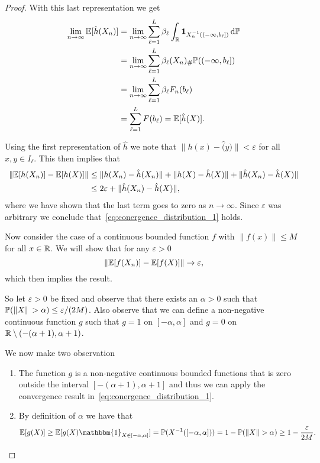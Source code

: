 \begin{proof}
With this last representation we get
\begin{align*}
	\lim_{n \to \infty} \mathbb E[\hat{h}(X_n)] 
	&= \lim_{n \to \infty} \sum_{\ell = 1}^L \beta_\ell \int_{\mathbb R} \mathbf{1}_{X_n^{-1}((-\infty,b_\ell])} \, \mathrm{d} \mathbb P \\
	&= \lim_{n \to \infty} 	\sum_{\ell = 1}^L \beta_\ell (X_n)_\# \mathbb P ((-\infty, b_\ell]) \\
	&= \lim_{n \to \infty} 	\sum_{\ell = 1}^L \beta_\ell F_n(b_\ell) \\
	&= \sum_{\ell = 1}^L F(b_\ell) = \mathbb E[\hat{h}(X)].
\end{align*}

Using the first representation of $\hat{h}$ we note that $\|h(x) - \hat(y)\| < \varepsilon$ for all $x,y \in I_\ell$. This then implies that
\begin{align*}
	\|\mathbb E[h(X_n)] - \mathbb E[h(X)]\| &\le \|h(X_n) - \hat{h}(X_n)\| + \|h(X) - \hat{h}(X)\| + \|\hat{h}(X_n) - \hat{h}(X)\|\\
	&\le 2\varepsilon + \|\hat{h}(X_n) - \hat{h}(X)\|,
\end{align*}
where we have shown that the last term goes to zero as $n \to \infty$. Since $\varepsilon$ was arbitrary we conclude that~\eqref{eq:conergence_distribution_1} holds.

Now consider the case of a continuous bounded function $f$ with $\|f(x)\| \le M$ for all $x \in \mathbb R$. We will show that for any $\varepsilon > 0$
\[
	\|\mathbb E[f(X_n)] - \mathbb E[f(X)]\| \to \varepsilon,
\]
which then implies the result.

So let $\varepsilon > 0$ be fixed and observe that there exists an $\alpha > 0$ such that $\mathbb P(\|X|\ > \alpha) \le \varepsilon/(2M)$. Also observe that we can define a non-negative continuous function $g$ such that $g = 1$ on $[-\alpha, \alpha]$ and $g = 0$ on $\mathbb R \setminus (-(\alpha+1),\alpha+1)$.

We now make two observation
\begin{enumerate}
\item The function $g$ is a non-negative continuous bounded functions that is zero outside the interval $[-(\alpha+1), \alpha+1]$ and thus we can apply the convergence result in~\eqref{eq:conergence_distribution_1}.
\item By definition of $\alpha$ we have that 
\[
	\bbE[g(X)] \ge \bbE[g(X) \mathbbm{1}_{X \in [-\alpha, \alpha]}] = \bbP(X^{-1}([-\alpha,\alpha]))
	= 1 - \bbP(\|X\| > \alpha) \ge 1 - \frac{\varepsilon}{2M}.
\] 
\end{enumerate}


\end{proof}
